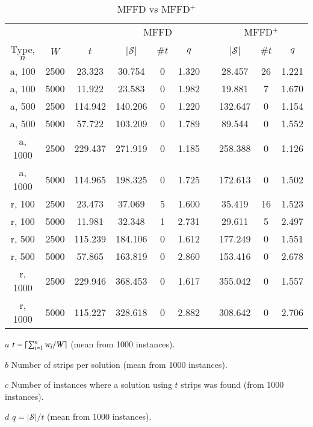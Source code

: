 \documentclass{elsarticle}
\begin{document}
\begin{table}[h!]
\centering
\caption{MFFD vs MFFD$^+$}
\begin{threeparttable}
\begin{tabular}{c@{\hspace{20pt}}c@{\hspace{20pt}}c@{\hspace{20pt}}c@{\hspace{20pt}}c@{\hspace{20pt}}ccc@{\hspace{20pt}}c@{\hspace{20pt}}c@{\hspace{8pt}}}\toprule
	& & & \multicolumn{3}{c}{MFFD} &\phantom{a}& \multicolumn{3}{c}{MFFD$^+$}\\
	\cmidrule{4-6} \cmidrule{8-10}
	Type, $n$ & $W$ & $t$\tnote{$a$} & $|\mathcal{S}|$\tnote{$b$} & $\# t$\tnote{$c$} & $q$\tnote{$d$} && $|\mathcal{S}|$ & $\# t$ & $q$\\ \midrule	
	a, 100 & 2500 & 23.323 & 30.754 & 0 & 1.320 && 28.457 & 26 & 1.221 \\
	a, 100 & 5000 & 11.922 & 23.583 & 0 & 1.982 && 19.881 & 7 & 1.670  \\
	\midrule
	a, 500 & 2500 & 114.942 & 140.206 & 0 & 1.220 && 132.647 & 0 & 1.154 \\
	a, 500 & 5000 & 57.722 & 103.209 & 0 & 1.789 && 89.544 & 0 & 1.552 \\
	\midrule
	a, 1000 & 2500 & 229.437 & 271.919 & 0 & 1.185 && 258.388 & 0 & 1.126 \\
	a, 1000 & 5000 & 114.965 & 198.325 & 0 & 1.725 && 172.613 & 0 & 1.502 \\
	\midrule
	\midrule
	r, 100 & 2500 & 23.473 & 37.069 & 5 & 1.600 && 35.419 & 16 & 1.523 \\
	r, 100 & 5000 & 11.981 & 32.348 & 1 & 2.731 && 29.611 & 5 & 2.497 \\
	\midrule
	r, 500 & 2500 & 115.239 & 184.106 & 0 & 1.612 && 177.249 & 0 & 1.551 \\
	r, 500 & 5000 & 57.865 & 163.819 & 0 & 2.860 && 153.416 & 0 & 2.678 \\
	\midrule
	r, 1000 & 2500 & 229.946 & 368.453 & 0 & 1.617 && 355.042 & 0 & 1.557 \\
	r, 1000 & 5000 & 115.227 & 328.618 & 0 & 2.882 && 308.642 & 0 & 2.706 \\
	\bottomrule
\end{tabular}
\vspace{0.2cm} %
\begin{tablenotes}
	\item[$a$] $t = \lceil\sum_{i=1}^{n} w_i / W\rceil$ (mean from 1000 instances).
	\item[$b$] Number of strips per solution (mean from 1000 instances).
	\item[$c$] Number of instances where a solution using $t$ strips was found (from 1000 instances).
	\item[$d$] $q = |\mathcal{S}| /t$ (mean from 1000 instances).
\end{tablenotes}	
\end{threeparttable}	
\label{table:heuristics}
\end{table}
\end{document}
